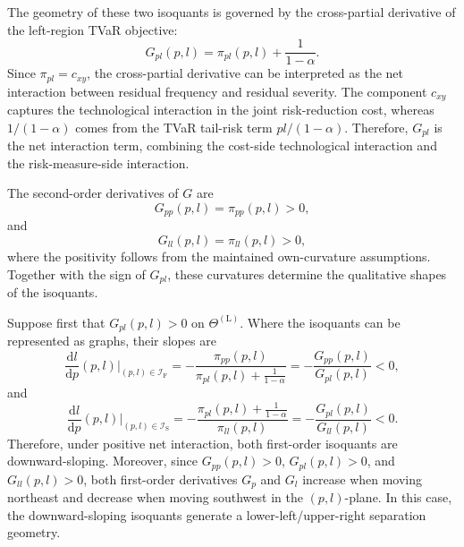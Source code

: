 \documentclass[a4paper,12pt]{article}
\begin{document}
The geometry of these two isoquants is governed by the cross-partial derivative of the left-region TVaR objective:
\begin{equation}
G_{pl}\left(p,l\right)=\pi_{pl}\left(p,l\right)+\frac{1}{1-\alpha}.
\label{eq:G_pl}
\end{equation}
Since $\pi_{pl}=c_{xy}$, the cross-partial derivative can be interpreted as the net interaction between residual frequency and residual severity. The component $c_{xy}$ captures the technological interaction in the joint risk-reduction cost, whereas $1/\left(1-\alpha\right)$ comes from the TVaR tail-risk term $pl/\left(1-\alpha\right)$. Therefore, $G_{pl}$ is the net interaction term, combining the cost-side technological interaction and the risk-measure-side interaction.

The second-order derivatives of $G$ are
\begin{equation*}
G_{pp}\left(p,l\right)=\pi_{pp}\left(p,l\right)>0,
\end{equation*}
and
\begin{equation*}
G_{ll}\left(p,l\right)=\pi_{ll}\left(p,l\right)>0,
\end{equation*}
where the positivity follows from the maintained own-curvature assumptions. Together with the sign of $G_{pl}$, these curvatures determine the qualitative shapes of the isoquants.

Suppose first that $G_{pl}\left(p,l\right)>0$ on $\Theta^{\left(\text{L}\right)}$. Where the isoquants can be represented as graphs, their slopes are
\begin{equation}
\frac{\text{d}l}{\text{d}p}\left(p,l\right)\bigg\vert_{\left(p,l\right)\in\mathcal{I}_{\text{F}}}=-\frac{\pi_{pp}\left(p,l\right)}{\pi_{pl}\left(p,l\right)+\frac{1}{1-\alpha}}=-\frac{G_{pp}\left(p,l\right)}{G_{pl}\left(p,l\right)}<0,
\label{eq:mathcal_I_F_negative}
\end{equation}
and
\begin{equation}
\frac{\text{d}l}{\text{d}p}\left(p,l\right)\bigg\vert_{\left(p,l\right)\in\mathcal{I}_{\text{S}}}=-\frac{\pi_{pl}\left(p,l\right)+\frac{1}{1-\alpha}}{\pi_{ll}\left(p,l\right)}=-\frac{G_{pl}\left(p,l\right)}{G_{ll}\left(p,l\right)}<0.
\label{eq:mathcal_I_S_negative}
\end{equation}
Therefore, under positive net interaction, both first-order isoquants are downward-sloping. Moreover, since $G_{pp}\left(p,l\right)>0$, $G_{pl}\left(p,l\right)>0$, and $G_{ll}\left(p,l\right)>0$, both first-order derivatives $G_p$ and $G_l$ increase when moving northeast and decrease when moving southwest in the $\left(p,l\right)$-plane. In this case, the downward-sloping isoquants generate a lower-left/upper-right separation geometry.
\end{document}
